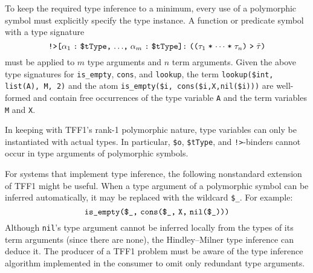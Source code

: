 
 To keep the required type
inference to a minimum, every use of a polymorphic symbol must explicitly
specify the type instance. A function or predicate symbol with a type signature
\[\hbox{{\tt !>[$\alpha_1$\;:\;\$tType,\;${\dots}$,\;$\alpha_m$\;:\;\$tType]:\;%
(($\tau_1$\;*\;${\cdots}$\;*\;$\tau_n$)\;>\;$\tilde \tau$)}}\]
must be applied to $m$ type arguments and $n$ term arguments. Given the above
type signatures for {\tt is\_empty}, {\tt cons}, and {\tt lookup}, the term
\hbox{\tt lookup(\$int,\;\,list(A),\;\,M,\;\,2)}
and the atom
\hbox{\tt is\_empty(\$i,\;\,cons(\$i,\;X,\;nil(\$i)))}
are well-formed and contain free occurrences of the type variable {\tt A}
and the term variables {\tt M} and {\tt X}.

In keeping with TFF1's rank-1 polymorphic nature, type variables can only be
instantiated with actual types. In particular, \verb+$o+, \verb+$tType+,
and {\tt !>}-binders cannot occur in type arguments of polymorphic symbols.

For systems that implement type inference, the following nonstandard extension
of TFF1 might be useful. When a type argument of
a polymorphic symbol can be inferred automatically, it may be
replaced with the wildcard {\tt \$\_}. For example:
\[\hbox{{\tt is\_empty(\$\_,} {\tt cons(\$\_,\;X,\;nil(\$\_)))}}\]
Although {\tt nil}'s type argument cannot be inferred locally from the types of
its term arguments (since there are none), the Hindley--Milner type inference
can deduce it. The producer of a TFF1 problem must be aware of the type
inference algorithm implemented in the consumer to omit only redundant type
arguments.

